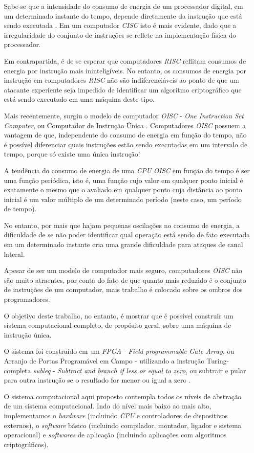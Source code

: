 Sabe-se que a intensidade do consumo de energia de um processador digital, em um
determinado instante do tempo, depende diretamente da instrução que está sendo
executada \cite{hsieh2001microprocessor}. Em um computador \textit{CISC} isto é
mais evidente, dado que a irregularidade do conjunto de instruções se reflete na
implementação física do processador.

Em contrapartida, é de se esperar que computadores \textit{RISC} reflitam
consumos de energia por instrução mais ininteligíveis. No entanto, os consumos
de energia por instrução em computadores \textit{RISC} não são indiferenciáveis
ao ponto de que um atacante experiente seja impedido de identificar um algoritmo
criptográfico que está sendo executado em uma máquina deste tipo.

Mais recentemente, surgiu o modelo de computador \textit{OISC} - \textit{One
  Instruction Set Computer}, ou Computador de Instrução Única
\cite{ong2010implementation}. Computadores \textit{OISC} possuem a vantagem de
que, independente do consumo de energia em função do tempo, não é possível
diferenciar quais instruções estão sendo executadas em um intervalo de tempo,
porque só existe uma única instrução!

A tendência do consumo de energia de uma \textit{CPU} \textit{OISC} em função do
tempo é ser uma função periódica, isto é, uma função cujo valor em qualquer
ponto inicial é exatamente o mesmo que o avaliado em qualquer ponto cuja
distância ao ponto inicial é um valor múltiplo de um determinado período (neste
caso, um período de tempo).

No entanto, por mais que hajam pequenas oscilações no consumo de energia, a
dificuldade de se não poder identificar qual operação está sendo de fato
executada em um determinado instante cria uma grande dificuldade para ataques de
canal lateral.

Apesar de ser um modelo de computador mais seguro, computadores \textit{OISC}
não são muito atraentes, por conta do fato de que quanto mais reduzido é o
conjunto de instruções de um computador, mais trabalho é colocado sobre os
ombros dos programadores.

O objetivo deste trabalho, no entanto, é mostrar que é possível construir um
sistema computacional completo, de propósito geral, sobre uma máquina de
instrução única.

O sistema foi construído em um \textit{FPGA} - \textit{Field-programmable Gate
  Array}, ou Arranjo de Portas Programável em Campo \cite{brant2012zuma} -
utilizando a instrução Turing-completa \textit{subleq} - \textit{Subtract and
  branch if less or equal to zero}, ou subtrair e pular para outra instrução se
o resultado for menor ou igual a zero \cite{subleq}.

O sistema computacional aqui proposto contempla todos os níveis de abstração de
um sistema computacional. Indo do nível mais baixo ao mais alto, implementamos o
\textit{hardware} (incluindo \textit{CPU} e controladores de dispositivos
externos), o \textit{software} básico (incluindo compilador, montador, ligador e
sistema operacional) e \textit{softwares} de aplicação (incluindo aplicações com
algoritmos criptográficos).


